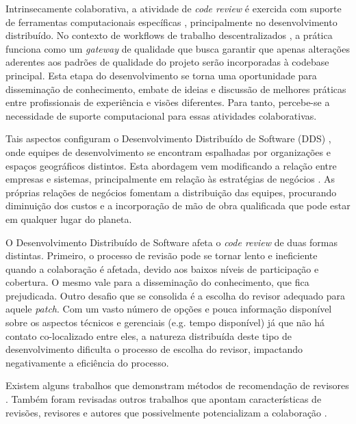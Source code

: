 \documentclass[sigconf]{acmart}
\begin{document}
Intrinsecamente colaborativa, a atividade de \textit{code review} é exercida com suporte de ferramentas computacionais específicas \cite{Bacchelli2013}, principalmente no desenvolvimento distribuído. No contexto de workflows de trabalho descentralizados \cite{gousios2016}, a prática funciona como um \textit{gateway} de qualidade que busca garantir que apenas alterações aderentes aos padrões de qualidade do projeto serão incorporadas à codebase principal. Esta etapa do desenvolvimento se torna uma oportunidade para disseminação de conhecimento, embate de ideias e discussão de melhores práticas entre profissionais de experiência e visões diferentes. Para tanto, percebe-se a necessidade de suporte computacional para essas atividades colaborativas.

Tais aspectos configuram o Desenvolvimento Distribuído de Software (DDS) \cite{herbsleb2003}, onde equipes de desenvolvimento se encontram espalhadas por organizações e espaços geográficos distintos. Esta abordagem vem modificando a relação entre empresas e sistemas, principalmente em relação às estratégias de negócios \cite{audy2007}. As próprias relações de negócios fomentam a distribuição das equipes, procurando diminuição dos custos e a incorporação de mão de obra qualificada que pode estar em qualquer lugar do planeta.


O Desenvolvimento Distribuído de Software afeta o \textit{code review} de duas formas distintas. Primeiro, o processo de revisão pode se tornar lento e ineficiente quando a colaboração é afetada, devido aos baixos níveis de participação e cobertura. O mesmo vale para a disseminação do conhecimento, que fica prejudicada. Outro desafio que se consolida é a escolha do revisor adequado para aquele \textit{patch}. Com um vasto número de opções e pouca informação disponível sobre os aspectos técnicos e gerenciais (e.g. tempo disponível) já que não há contato co-localizado entre eles, a natureza distribuída deste tipo de desenvolvimento dificulta o processo de escolha do revisor, impactando negativamente a eficiência do processo.

 Existem alguns trabalhos que demonstram métodos de recomendação de revisores \cite{yu2014,Xia2015261,jiang2017}. Também foram revisadas outros trabalhos que apontam características de revisões, revisores e autores que possivelmente potencializam a colaboração \cite{Kemerer2009,Bird2015191,Baysal2013122}.
\end{document}
